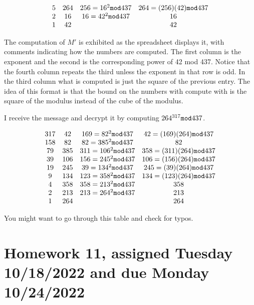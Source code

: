 \documentclass[12pt]{article}
\begin{document}
$$\begin{array}{cccc}

5 &  264 & 256 = 16^2 {\tt mod}437& 264 = (256)(42){\tt mod}437\\
2 & 16 & 16 = 42^2 {\tt mod}437& 16 \\
1 & 42 &  & 42 \\
\end{array}$$

The computation of $M'$ is exhibited as the spreadsheet displays it, with comments indicating how the numbers are computed.  The first column is the exponent and the second is the corresponding power of 42 mod 437.  Notice that the fourth column repeats the third unless the exponent in that row is odd.  In the third column what is computed is just the square of the previous entry.  The idea of this format is that the bound on the numbers with compute with is the square of the modulus instead of the cube of the modulus.

I receive the message and decrypt it by computing $264^{317}{\tt mod}437$.

$$\begin{array}{cccc}

317 &  42 & 169= 82^2 {\tt mod}437& 42 = (169)(264){\tt mod}437\\

158 &  82 & 82 = 385^2 {\tt mod}437& 82\\

79 &  385 & 311 = 106^2 {\tt mod}437& 358 = (311)(264){\tt mod}437\\

39 &  106& 156 = 245^2 {\tt mod}437& 106= (156)(264){\tt mod}437\\

19 &  245 & 39 = 134^2 {\tt mod}437& 245 = (39)(264){\tt mod}437\\

9 &  134 & 123 = 358^2 {\tt mod}437& 134 = (123)(264){\tt mod}437\\

4 &  358 & 358 = 213^2 {\tt mod}437& 358\\
2 & 213 & 213 = 264^2 {\tt mod}437& 213\\
1 & 264 &  & 264 \\
\end{array}$$

You might want to go through this table and check for typos.

\section{Homework 11, assigned Tuesday 10/18/2022 and due Monday 10/24/2022}
\end{document}
